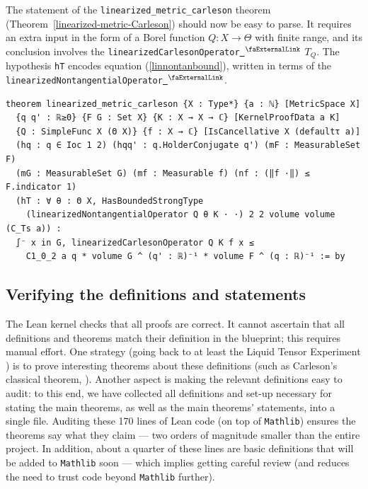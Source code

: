 \documentclass[12pt]{amsart}
\newcounter{lstlisting}[section]
\newcommand{\lean}[1]{\lstinline{#1}}
\newcommand{\mathlib}{\texttt{Mathlib}\xspace}
\newcommand{\extlink}{~\ensuremath{{}^\text{\faExternalLink}}}
\theoremstyle{definition}
\theoremstyle{plain}
\begin{document}
The statement of the \lean{linearized_metric_carleson} theorem (Theorem~\ref{linearized-metric-Carleson}) should now be easy to parse. It requires an extra input in the form of a Borel function $Q\colon X \to \Theta$ with finite range, and its conclusion involves the
\lean{linearizedCarlesonOperator}\href{https://github.com/fpvandoorn/carleson/blob/020d6e5c71d731952eb0379d222eea4049103ca0/Carleson/Defs.lean#L222}{\extlink} $T_Q$. The hypothesis \lean{hT} encodes equation (\ref{linnontanbound}), written in terms of the
\lean{linearizedNontangentialOperator}\href{https://github.com/fpvandoorn/carleson/blob/020d6e5c71d731952eb0379d222eea4049103ca0/Carleson/Defs.lean#L204}{\extlink}.
\begin{lstlisting}[mathescape]
theorem linearized_metric_carleson {X : Type*} {a : ℕ} [MetricSpace X]
  {q q' : ℝ≥0} {F G : Set X} {K : X → X → ℂ} [KernelProofData a K]
  {Q : SimpleFunc X (Θ X)} {f : X → ℂ} [IsCancellative X (defaultτ a)]
  (hq : q ∈ Ioc 1 2) (hqq' : q.HolderConjugate q') (mF : MeasurableSet F)
  (mG : MeasurableSet G) (mf : Measurable f) (nf : (‖f ·‖) ≤ F.indicator 1)
  (hT : ∀ θ : Θ X, HasBoundedStrongType
    (linearizedNontangentialOperator Q θ K · ·) 2 2 volume volume (C_Ts a)) :
  ∫⁻ x in G, linearizedCarlesonOperator Q K f x ≤
    C1_0_2 a q * volume G ^ (q' : ℝ)⁻¹ * volume F ^ (q : ℝ)⁻¹ := by
\end{lstlisting}

\subsection{Verifying the definitions and statements}

The Lean kernel checks that all proofs are correct. It cannot ascertain that all definitions and theorems match their definition in the blueprint; this requires manual effort.
One strategy (going back to at least the Liquid Tensor Experiment \cite{LTEDefinitions}) is to prove interesting theorems about these definitions (such as Carleson's classical theorem, ).
Another aspect is making the relevant definitions easy to audit: to this end, we have collected all definitions and set-up necessary for stating the main theorems, as well as the main theorems' statements, into a single file. Auditing these 170 lines of Lean code (on top of \mathlib) ensures the theorems say what they claim --- two orders of magnitude smaller than the entire project.
In addition, about a quarter of these lines are basic definitions that will be added to \mathlib soon --- which implies getting careful review (and reduces the need to trust code beyond \mathlib further).
\end{document}
